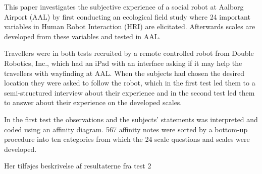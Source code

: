 \label{Abstract}
This paper investigates the subjective experience of a social robot at Aalborg Airport (AAL) by first conducting an ecological field study where 24 important variables in Human Robot Interaction (HRI) are elicitated. Afterwards scales are developed from these variables and tested in AAL. 

Travellers were in both tests recruited by a remote controlled robot from Double Robotics, Inc., which had an iPad with an interface asking if it may help the travellers with wayfinding at AAL. When the subjects had chosen the desired location they were asked to follow the robot, which in the first test led them to a semi-structured interview about their experience and in the second test led them to answer about their experience on the developed scales. 

In the first test the observations and the subjects' statements was interpreted and coded using an affinity diagram. 567 affinity notes were sorted by a bottom-up procedure into ten categories from which the 24 scale questions and scales were developed.

{\color{red} Her tilføjes beskrivelse af resultaterne fra test 2}

%
%



